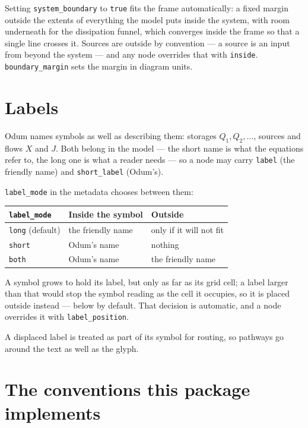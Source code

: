 \documentclass{article}
\begin{document}
Setting \texttt{system\_boundary} to \texttt{true} fits the frame
automatically: a fixed margin outside the extents of everything the model puts
inside the system, with room underneath for the dissipation funnel, which
converges inside the frame so that a single line crosses it. Sources are outside
by convention --- a source is an input from beyond the system --- and any node
overrides that with \texttt{inside}. \texttt{boundary\_margin} sets the margin
in diagram units.

\section{Labels}
\label{sec:labels}

Odum names symbols as well as describing them: storages $Q_1, Q_2, \ldots$,
sources and flows $X$ and $J$. Both belong in the model --- the short name is
what the equations refer to, the long one is what a reader needs --- so a node
may carry \texttt{label} (the friendly name) and \texttt{short\_label} (Odum's).

\texttt{label\_mode} in the metadata chooses between them:

\begin{table}[H]
\centering
\begin{tabular}{lll}
\toprule
\texttt{label\_mode} & Inside the symbol & Outside \\
\midrule
\texttt{long} (default) & the friendly name & only if it will not fit \\
\texttt{short}          & Odum's name       & nothing \\
\texttt{both}           & Odum's name       & the friendly name \\
\bottomrule
\end{tabular}
\end{table}

A symbol grows to hold its label, but only as far as its grid cell; a label
larger than that would stop the symbol reading as the cell it occupies, so it is
placed outside instead --- below by default. That decision is automatic, and a
node overrides it with \texttt{label\_position}.

A displaced label is treated as part of its symbol for routing, so pathways go
around the text as well as the glyph.

\section{The conventions this package implements}
\label{sec:conventions}
\end{document}
